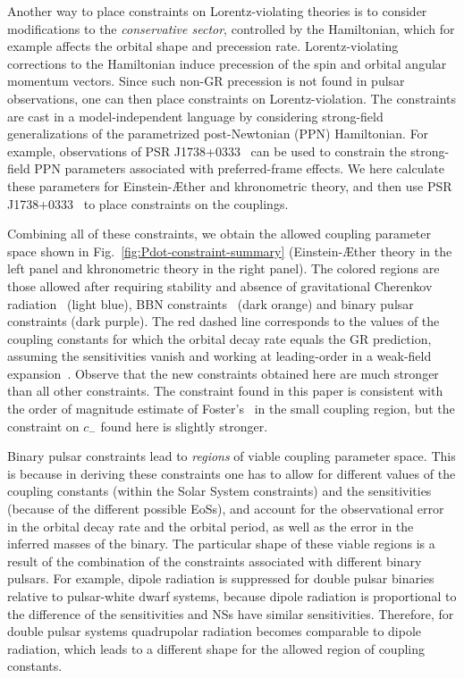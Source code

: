 \documentclass[prd,aps,twocolumn,nofootinbib,showpacs,superscriptaddress]{revtex4-1}
\begin{document}
Another way to place constraints on Lorentz-violating theories is to consider modifications to the {\textit{conservative sector}}, controlled by the Hamiltonian, which for example affects the orbital shape and precession rate.    
Lorentz-violating corrections to the Hamiltonian induce precession of the spin and orbital angular momentum vectors. 
Since such non-GR precession is not found in pulsar observations, one can then place constraints on Lorentz-violation. 
The constraints are cast in a model-independent language by considering strong-field generalizations of the parametrized post-Newtonian (PPN) Hamiltonian. For example, observations
of PSR J1738+0333~\cite{freire} can be used to constrain the strong-field PPN parameters associated with preferred-frame effects. We here calculate these parameters for Einstein-\AE ther and khronometric theory, and then use PSR J1738+0333~\cite{freire} to place constraints on the couplings. 

Combining all of these constraints, we obtain the allowed coupling parameter space shown in 
Fig.~\ref{fig:Pdot-constraint-summary} (Einstein-\AE ther theory in the left panel 
and khronometric theory in the right panel).  The colored regions are those allowed after requiring stability and absence of
gravitational Cherenkov radiation~\cite{Blas:2010hb,Barausse:2011pu,Elliott:2005va} (light blue), 
BBN constraints~\cite{Audren:2013dwa,Carroll:2004ai,Zuntz:2008zz,Jacobson:2008aj} (dark orange) and binary pulsar constraints (dark purple). 
The red dashed line corresponds to the values of the coupling constants for which the orbital decay rate equals the GR prediction, 
assuming the sensitivities vanish and working at leading-order in a weak-field expansion~\cite{Foster:2005dk}. Observe 
that the new constraints obtained here are much stronger than all other constraints. The constraint found in this paper is consistent with the order of magnitude estimate of Foster's~\cite{Foster:2007gr} in the small coupling region, but  the constraint on $c_{-}$ found here is slightly stronger. 

Binary pulsar constraints lead to {\textit{regions}} of viable coupling parameter space. This is because in deriving these constraints one has to allow for different values of the coupling constants (within the Solar System constraints) and the sensitivities (because of the different possible EoSs), and account for the observational error in the orbital decay rate and the orbital period, as well as the error in the inferred masses of the binary. The particular shape of these viable regions is a result of the combination of the constraints associated with different binary pulsars. For example, dipole radiation is suppressed for double pulsar binaries relative to pulsar-white dwarf systems, because dipole radiation is proportional to the difference of the sensitivities and NSs have similar sensitivities. Therefore, for double pulsar systems quadrupolar radiation becomes comparable to dipole radiation,
which leads to a different shape for the allowed region of coupling constants.
\end{document}
